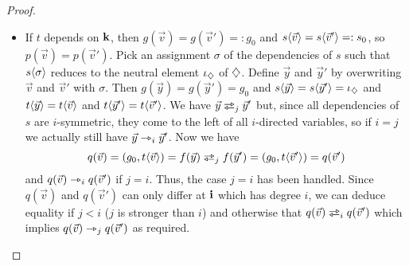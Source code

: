 \documentclass[a4paper]{memoir}
\begin{document}
\begin{proof}
\begin{itemize}
\begin{itemize}
\begin{itemize}
\begin{itemize}
					\item If $t$ depends on $\mathbf{k}$, then $g(\vec v) = g(\vec v') =: g_0$ and $s \langle \vec v \rangle = s \langle \vec v' \rangle =: s_0$, so $p(\vec v) = p(\vec v')$.
					Pick an assignment $\sigma$ of the dependencies of $s$ such that $s \langle \sigma \rangle$ reduces to the neutral element $\iota_{\mathbin{\diamondsuit}}$ of $\mathbin{\diamondsuit}$.
					Define $\vec y$ and $\vec y'$ by overwriting $\vec v$ and $\vec v'$ with $\sigma$.
					Then $g(\vec y) = g(\vec y') = g_0$ and $s \langle \vec y \rangle = s \langle \vec y' \rangle = \iota_{\mathbin{\diamondsuit}}$ and $t \langle \vec y \rangle = t \langle \vec v \rangle$ and $t \langle \vec y' \rangle = t \langle \vec v' \rangle$.
					We have $\vec y \infrajet_j \vec y'$ but, since all dependencies of $s$ are $i$-symmetric, they come to the left of all $i$-directed variables, so if $i = j$ we actually still have $\vec y \rightarrowtriangle_i \vec y'$.
					Now we have
					\[
						q(\vec v) = (g_0, t \psub{\vec v}) = f(\vec y) \infrajet_j f(\vec y') = (g_0, t \psub{\vec v'}) = q(\vec v')
					\]
					and $q(\vec v) \rightarrowtriangle_i q(\vec v')$ if $j = i$.
					Thus, the case $j = i$ has been handled.
					Since $q(\vec v)$ and $q(\vec v')$ can only differ at $\mathbf{i}$ which has degree $i$, we can deduce equality if $j < i$ ($j$ is stronger than $i$) and otherwise that $q(\vec v) \infrajet_i q(\vec v')$ which implies $q(\vec v) \rightarrowtriangle_j q(\vec v')$ as required. \qedhere
				\end{itemize}
			\end{itemize}
		\end{itemize}
	\end{itemize}
\end{proof}
\end{document}
